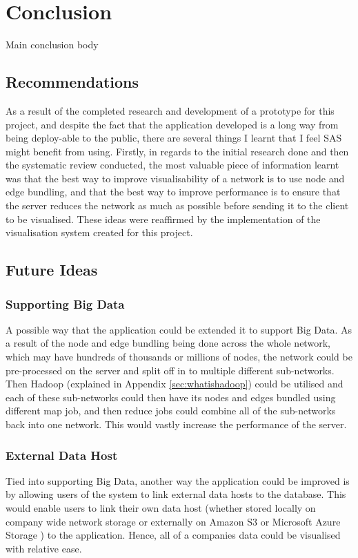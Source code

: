 \documentclass[../dissertation.tex]{subfiles}
\begin{document}
\chapter{Conclusion}

Main conclusion body

\section{Recommendations}

As a result of the completed research and development of a prototype for this project, and despite the fact that the application developed is a long way from being deploy-able to the public, there are several things I learnt that I feel SAS might benefit from using. Firstly, in regards to the initial research done and then the systematic review conducted, the most valuable piece of information learnt was that the best way to improve visualisability of a network is to use node and edge bundling, and that the best way to improve performance is to ensure that the server reduces the network as much as possible before sending it to the client to be visualised. These ideas were reaffirmed by the implementation of the visualisation system created for this project.

\section{Future Ideas}
\label{sec:further_ideas}

\subsection{Supporting Big Data}

A possible way that the application could be extended it to support Big Data. As a result of the node and edge bundling being done across the whole network, which may have hundreds of thousands or millions of nodes, the network could be pre-processed on the server and split off in to multiple different sub-networks. Then Hadoop \cite{hadoop} (explained in Appendix \ref{sec:whatishadoop}) could be utilised and each of these sub-networks could then have its nodes and edges bundled using different map job, and then reduce jobs could combine all of the sub-networks back into one network. This would vastly increase the performance of the server.

\subsection{External Data Host}

Tied into supporting Big Data, another way the application could be improved is by allowing users of the system to link external data hosts to the database. This would enable users to link their own data host (whether stored locally on company wide network storage or externally on Amazon S3 \cite{amazons3} or Microsoft Azure Storage \cite{msftazure}) to the application. Hence, all of a companies data could be visualised with relative ease.
\end{document}
